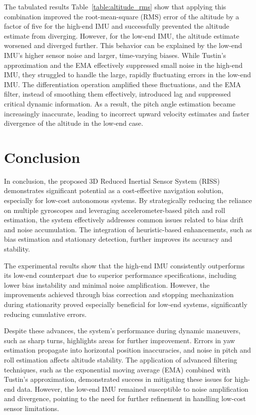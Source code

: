 \documentclass[conference]{IEEEtran}
\begin{document}
The tabulated results Table~\ref{table:altitude_rms} show that applying this combination improved the root-mean-square (RMS) error of the altitude by a factor of five for the high-end IMU and successfully prevented the altitude estimate from diverging. However, for the low-end IMU, the altitude estimate worsened and diverged further. This behavior can be explained by the low-end IMU’s higher sensor noise and larger, time-varying biases. While Tustin’s approximation and the EMA effectively suppressed small noise in the high-end IMU, they struggled to handle the large, rapidly fluctuating errors in the low-end IMU. The differentiation operation amplified these fluctuations, and the EMA filter, instead of smoothing them effectively, introduced lag and suppressed critical dynamic information. As a result, the pitch angle estimation became increasingly inaccurate, leading to incorrect upward velocity estimates and faster divergence of the altitude in the low-end case.

\section{Conclusion}

In conclusion, the proposed 3D Reduced Inertial Sensor System (RISS) demonstrates significant potential as a cost-effective navigation solution, especially for low-cost autonomous systems. By strategically reducing the reliance on multiple gyroscopes and leveraging accelerometer-based pitch and roll estimation, the system effectively addresses common issues related to bias drift and noise accumulation. The integration of heuristic-based enhancements, such as bias estimation and stationary detection, further improves its accuracy and stability.

The experimental results show that the high-end IMU consistently outperforms its low-end counterpart due to superior performance specifications, including lower bias instability and minimal noise amplification. However, the improvements achieved through bias correction and stopping mechanization during stationarity proved especially beneficial for low-end systems, significantly reducing cumulative errors.

Despite these advances, the system’s performance during dynamic maneuvers, such as sharp turns, highlights areas for further improvement. Errors in yaw estimation propagate into horizontal position inaccuracies, and noise in pitch and roll estimation affects altitude stability. The application of advanced filtering techniques, such as the exponential moving average (EMA) combined with Tustin’s approximation, demonstrated success in mitigating these issues for high-end data. However, the low-end IMU remained susceptible to noise amplification and divergence, pointing to the need for further refinement in handling low-cost sensor limitations.
\end{document}
